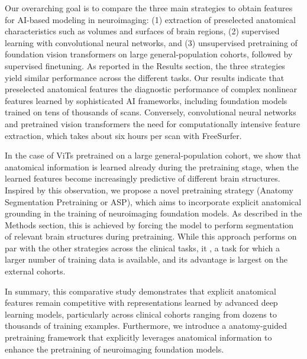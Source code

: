 \documentclass[pdflatex,sn-nature]{sn-jnl}%
\newif\ifhighlight
\newcommand{\rev}[1]{\ifhighlight{\color{blue}{}#1}\else#1\fi}%
\newcommand{\revdel}[1]{\ifhighlight{\color{red}\sout{#1}}\fi}
\theoremstyle{thmstyleone}%
\theoremstyle{thmstyletwo}%
\theoremstyle{thmstylethree}%
\begin{document}
Our overarching goal is to compare the three main strategies to obtain features for AI-based modeling in neuroimaging: (1) extraction of preselected anatomical characteristics such as volumes and surfaces of brain regions, (2) supervised learning with convolutional neural networks, and (3) unsupervised pretraining of foundation vision transformers on large general-population cohorts, followed by supervised finetuning. As reported in the Results section, the three strategies yield similar performance across the different tasks. Our results indicate that preselected anatomical features \revdel{match} the diagnostic performance of complex nonlinear features learned by sophisticated AI frameworks, including foundation models trained on \rev{tens of} thousands of scans. Conversely, convolutional neural networks and pretrained vision transformers \revdel{learn features that implicitly capture relevant anatomical information, bypassing} the need for computationally intensive feature extraction\rev{, which takes about six hours per scan with FreeSurfer}. 

In the case of ViTs pretrained on a large general-population cohort, we show that anatomical information is learned already during the pretraining stage, when the learned features become increasingly predictive of different brain structures. Inspired by this observation, we propose a novel pretraining strategy  (Anatomy Segmentation Pretraining or ASP), which aims to incorporate explicit anatomical grounding in the training of neuroimaging foundation models. As described in the Methods section, this is achieved by forcing the model to perform segmentation of relevant brain structures during pretraining. While this approach performs on par with the other strategies across the clinical tasks, it \revdel{achieves superior performance in estimating biological age}, a task for which a larger number of training data is available\rev{, and its advantage is largest on the external cohorts}.

In summary, this comparative study demonstrates that explicit anatomical features remain competitive with representations learned by advanced deep learning models, particularly across clinical cohorts ranging from dozens to thousands of training examples. Furthermore, we introduce a \revdel{novel, } anatomy-guided pretraining framework that explicitly leverages anatomical information to enhance the pretraining of neuroimaging foundation models.
\end{document}
